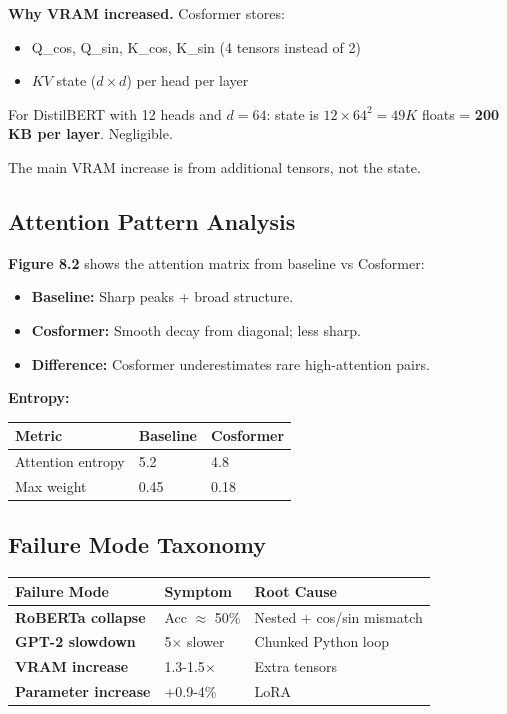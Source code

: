 \textbf{Why VRAM increased.} Cosformer stores:
\begin{itemize}
\item Q\_cos, Q\_sin, K\_cos, K\_sin (4 tensors instead of 2)
\item $KV$ state ($d \times d$) per head per layer

\end{itemize}
For DistilBERT with 12 heads and $d = 64$: state is $12 \times 64^2 = 49K$ 
floats = \textbf{200 KB per layer}. Negligible.

The main VRAM increase is from additional tensors, not the state.

\subsection{Attention Pattern Analysis}

\textbf{Figure 8.2} shows the attention matrix from baseline vs Cosformer:

\begin{itemize}
\item \textbf{Baseline:} Sharp peaks + broad structure.
\item \textbf{Cosformer:} Smooth decay from diagonal; less sharp.
\item \textbf{Difference:} Cosformer underestimates rare high-attention pairs.

\end{itemize}
\textbf{Entropy:}

\begin{table}[H]
\centering
\small
\begin{tabular}{lll}
\toprule
\textbf{Metric} & \textbf{Baseline} & \textbf{Cosformer} \\
\midrule
Attention entropy & 5.2 & 4.8 \\
Max weight & 0.45 & 0.18 \\
\bottomrule
\end{tabular}
\end{table}

\subsection{Failure Mode Taxonomy}

\begin{table}[H]
\centering
\small
\begin{tabular}{lll}
\toprule
\textbf{Failure Mode} & \textbf{Symptom} & \textbf{Root Cause} \\
\midrule
\textbf{RoBERTa collapse} & Acc $\approx$ 50\% & Nested + cos/sin mismatch \\
\textbf{GPT-2 slowdown} & 5$\times$ slower & Chunked Python loop \\
\textbf{VRAM increase} & 1.3-1.5$\times$ & Extra tensors \\
\textbf{Parameter increase} & +0.9-4\% & LoRA \\
\bottomrule
\end{tabular}
\end{table}

